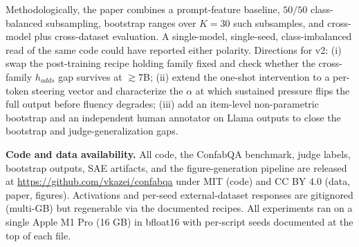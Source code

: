 Methodologically, the paper combines a prompt-feature baseline, \(50/50\) class-balanced subsampling, bootstrap ranges
over \(K=30\) such subsamples, and cross-model plus cross-dataset evaluation. A single-model, single-seed, class-imbalanced read of the same code could have reported either polarity. Directions for v2: (i)
swap the post-training recipe holding family fixed and check whether the
cross-family \(h_{adds}\) gap survives at \(\gtrsim 7\)B; (ii) extend
the one-shot intervention to a per-token steering vector \citep{turner2023actadd} and characterize the \(\alpha\) at which sustained pressure
flips the full output before fluency degrades; (iii) add an item-level
non-parametric bootstrap and an independent human annotator on Llama
outputs to close the bootstrap and judge-generalization gaps.

\textbf{Code and data availability.}
All code, the ConfabQA benchmark, judge labels, bootstrap outputs, SAE
artifacts, and the figure-generation pipeline are released at
\url{https://github.com/vkazei/confabqa} under MIT (code) and CC BY 4.0 (data, paper, figures). Activations and per-seed external-dataset responses are gitignored (multi-GB) but regenerable via the documented recipes. All experiments ran on a single Apple M1 Pro (16 GB) in
bfloat16 with per-script seeds documented at the top of each file.


